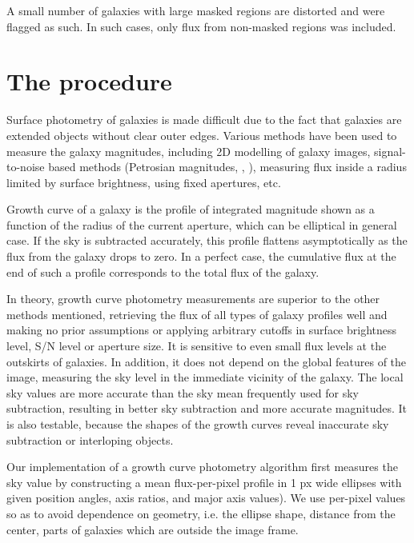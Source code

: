 \documentclass[apj, onecolumn]{emulateapj}
\begin{document}
A small number of galaxies with large masked regions are distorted and were flagged as such. In such cases, only flux from non-masked regions was included.

\section*{The procedure}

Surface photometry of galaxies is made difficult due to the fact that galaxies are extended objects without clear outer edges. Various methods have been used to measure the galaxy magnitudes, including 2D modelling of galaxy images, signal-to-noise based methods (Petrosian magnitudes, \cite{Petrosian1976}, \cite{Strauss2002}), measuring flux inside a radius limited by surface brightness, using fixed apertures, etc.

Growth curve of a galaxy is the profile of integrated magnitude shown as a function of the radius of the current aperture\cite{Okamura1999}, which can be elliptical in general case. If the sky is subtracted accurately, this profile flattens asymptotically as the flux from the galaxy drops to zero. In a perfect case, the cumulative flux at the end of such a profile corresponds to the total flux of the galaxy.

In theory, growth curve photometry measurements are superior to the other methods mentioned, retrieving the flux of all types of galaxy profiles well and making no prior assumptions or applying arbitrary cutoffs in surface brightness level, S/N level or aperture size. It is sensitive to even small flux levels at the outskirts of galaxies. In addition, it does not depend on the global features of the image, measuring the sky level in the immediate vicinity of the galaxy. The local sky values are more accurate than the sky mean frequently used for sky subtraction, resulting in better sky subtraction and more accurate magnitudes. It is also testable, because the shapes of the growth curves reveal inaccurate sky subtraction or interloping objects. 


Our implementation of a growth curve photometry algorithm first measures the sky value by constructing a mean flux-per-pixel profile in 1 px wide ellipses with given position angles, axis ratios, and major axis values). We use per-pixel values so as to avoid dependence on geometry, i.e. the ellipse shape, distance from the center, parts of galaxies which are outside the image frame.
\end{document}
